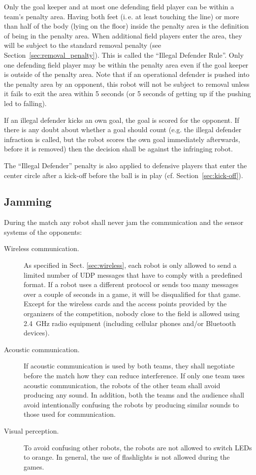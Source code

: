 \documentclass[12pt]{article}
\newcommand{\ie}{\mbox{i.\,e.}\xspace}
\newcommand{\cf}{\mbox{cf.}\xspace}
\begin{document}
Only the goal keeper and at most one defending field player can be within a team's penalty area. Having both feet (\ie at least touching the line) or more than half of the body (lying on the floor) inside the penalty area is the definition of being in the penalty area. When additional field players enter the area, they will be subject to the standard removal penalty (see Section~\ref{sec:removal_penalty}). This is called the ``Illegal Defender Rule''. Only one defending field player may be within the penalty area even if the goal keeper is outside of the penalty area.  Note that if an operational defender is pushed into the penalty area by an opponent, this robot will not be subject to removal unless it fails to exit the area within 5 seconds (or 5 seconds of getting up if the pushing led to falling).

If an illegal defender kicks an own goal, the goal is scored for the opponent. If there is any doubt about whether a goal should count (e.g. the illegal defender infraction is called, but the robot scores the own goal immediately afterwards, before it is removed) then the decision shall be against the infringing robot.

The ``Illegal Defender'' penalty is also applied to defensive players that enter the center circle after a kick-off before the ball is in play (\cf Section~\ref{sec:kick-off}).

\subsection{Jamming}
\label{sec:jamming}
During the match any robot shall never jam the communication and the sensor systems of the opponents:

\begin{description}

\item[Wireless communication.] As specified in Sect. \ref{sec:wireless}, each robot is only allowed to send a limited number of UDP messages that have to comply with a predefined format. If a robot uses a different protocol or sends too many messages over a couple of seconds in a game, it will be disqualified for that game. Except for the wireless cards and the access points provided by the organizers of the competition, nobody close to the field is allowed using 2.4~GHz radio equipment (including cellular phones and/or Bluetooth devices).

\item[Acoustic communication.] If acoustic communication is used by both teams, they shall negotiate before the match how they can reduce interference. If only one team uses acoustic communication, the robots of the other team shall avoid producing any sound. In addition, both the teams and the audience shall avoid intentionally confusing the robots by producing similar sounds to those used for communication.

\item[Visual perception.] To avoid confusing other robots, the robots are not allowed to switch LEDs to orange. In general, the use of flashlights is not allowed during the games.

\end{description}
\end{document}
